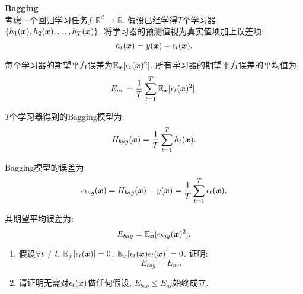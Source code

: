 \documentclass[answers]{exam}  %
\begin{document}
\begin{questions}
	\question [20] \textbf{Bagging} \\
	考虑一个回归学习任务$f:\mathbb{R}^d \rightarrow \mathbb{R}$. 假设已经学得$T$个学习器$\{h_1({\boldsymbol{x}}), h_2({\boldsymbol{x}}), \dots, h_T({\boldsymbol{x}})\}$. 将学习器的预测值视为真实值项加上误差项:
	\begin{equation}
		h_t({\boldsymbol{x}})=y({\boldsymbol{x}})+\epsilon_t({\boldsymbol{x}}).
	\end{equation}

	每个学习器的期望平方误差为$\mathbb{E}_{{\boldsymbol{x}}}[\epsilon_t({\boldsymbol{x}})^2]$. 所有学习器的期望平方误差的平均值为:
	\begin{equation}
		E_{av}=\frac{1}{T}\sum_{t=1}^T \mathbb{E}_{{\boldsymbol{x}}}[\epsilon_t({\boldsymbol{x}})^2].
	\end{equation}

	$T$个学习器得到的Bagging模型为:
	\begin{equation}
		H_{bag}({\boldsymbol{x}})=\frac{1}{T}\sum_{t=1}^T h_t({\boldsymbol{x}}).
	\end{equation}

	Bagging模型的误差为:
	\begin{equation}
		\epsilon_{bag}({\boldsymbol{x}})=H_{bag}({\boldsymbol{x}})-y({\boldsymbol{x}})=\frac{1}{T}\sum_{t=1}^T \epsilon_t({\boldsymbol{x}}),
	\end{equation}

	其期望平均误差为:
	\begin{equation}
		E_{bag}=\mathbb{E}_{{\boldsymbol{x}}}[\epsilon_{bag}({\boldsymbol{x}})^2].
	\end{equation}

	\begin{enumerate}
		\item 假设$\forall t\neq l$, $\mathbb{E}_{{\boldsymbol{x}}}[\epsilon_t({\boldsymbol{x}})]=0$, $ \mathbb{E}_{{\boldsymbol{x}}}[\epsilon_t({\boldsymbol{x}})\epsilon_l({\boldsymbol{x}})]=0$. 证明:
		      \begin{equation}
			      E_{bag}=E_{av}.
		      \end{equation}

		\item 请证明无需对$\epsilon_t({\boldsymbol{x}})$做任何假设, $E_{bag}\leq E_{av}$始终成立.
	\end{enumerate}


\end{questions}
\end{document}
